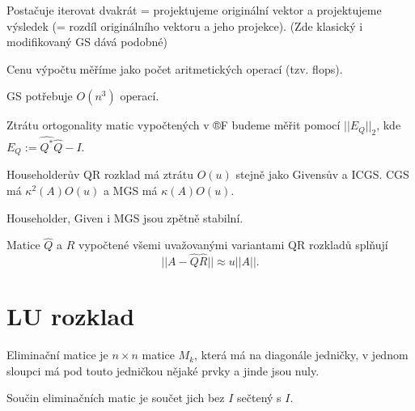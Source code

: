 \documentclass[12pt]{article}					%
\begin{document}
	\begin{definice}
		Postačuje iterovat dvakrát = projektujeme originální vektor a projektujeme výsledek (= rozdíl originálního vektoru a jeho projekce). (Zde klasický i modifikovaný GS dává podobné)
	\end{definice}

	\begin{definice}
		Cenu výpočtu měříme jako počet aritmetických operací (tzv. flops).
	\end{definice}

	\begin{poznamka}
		GS potřebuje $O(n^3)$ operací.
	\end{poznamka}

	\begin{definice}
		Ztrátu ortogonality matic vypočtených v ®F budeme měřit pomocí $||E_Q||_2$, kde $E_Q := \hat{Q^*}\hat{Q} - I$.

		\begin{prikladyin}
			Householderův QR rozklad má ztrátu $O(u)$ stejně jako Givensův a ICGS. CGS má $\kappa^2(A)O(u)$ a MGS má $\kappa(A) O(u)$.
		\end{prikladyin}
	\end{definice}

	\begin{poznamka}
		Householder, Given i MGS jsou zpětně stabilní.
	\end{poznamka}

	\begin{definice}
		Matice $\hat{Q}$ a $\hat{R}$ vypočtené všemi uvažovanými variantami QR rozkladů splňují
		$$ ||A - \hat{Q}\hat{R}|| \approx u||A||. $$
	\end{definice}


\section{LU rozklad}
\begin{definice}
	Eliminační matice je $n \times n$ matice $M_k$, která má na diagonále jedničky, v jednom sloupci má pod touto jedničkou nějaké prvky a jinde jsou nuly.

	\begin{poznamkain}
		Součin eliminačních matic je součet jich bez $I$ sečtený s $I$.
	\end{poznamkain}
\end{definice}
\end{document}
